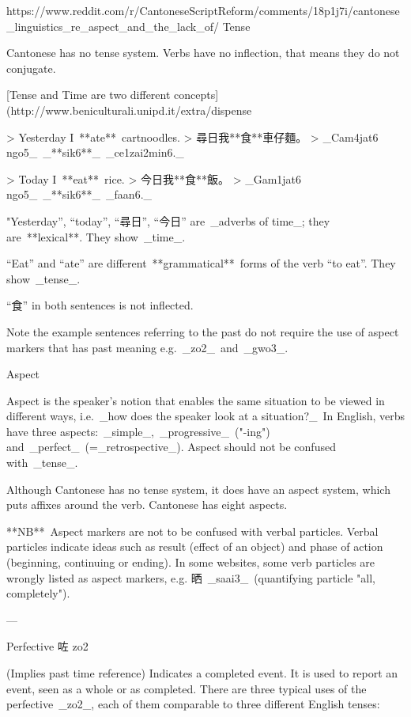 https://www.reddit.com/r/CantoneseScriptReform/comments/18p1j7i/cantonese_linguistics_re_aspect_and_the_lack_of/ 
Tense

Cantonese has no tense system. Verbs have no inflection, that means they do not conjugate.

[Tense and Time are two different concepts](http://www.beniculturali.unipd.it/extra/dispense%

> Yesterday I **ate** cartnoodles.  
> 尋日我**食**車仔麵。  
> _Cam4jat6 ngo5_ _**sik6**_ _ce1zai2min6._

> Today I **eat** rice.  
> 今日我**食**飯。  
> _Gam1jat6 ngo5_ _**sik6**_ _faan6._

"Yesterday”, “today”, “尋日”, “今日” are _adverbs of time_; they are **lexical**. They show _time_.

“Eat” and “ate” are different **grammatical** forms of the verb “to eat”. They show _tense_.

“食” in both sentences is not inflected.

Note the example sentences referring to the past do not require the use of aspect markers that has past meaning e.g. _zo2_ and _gwo3_.

Aspect

Aspect is the speaker's notion that enables the same situation to be viewed in different ways, i.e. _how does the speaker look at a situation?_ In English, verbs have three aspects: _simple_, _progressive_ ("-ing") and _perfect_ (=_retrospective_). Aspect should not be confused with _tense_.

Although Cantonese has no tense system, it does have an aspect system, which puts affixes around the verb. Cantonese has eight aspects.

**NB** Aspect markers are not to be confused with verbal particles. Verbal particles indicate ideas such as result (effect of an object) and phase of action (beginning, continuing or ending). In some websites, some verb particles are wrongly listed as aspect markers, e.g. 晒 _saai3_ (quantifying particle "all, completely").

---

Perfective 咗 zo2

(Implies past time reference) Indicates a completed event. It is used to report an event, seen as a whole or as completed.  
There are three typical uses of the perfective _zo2_, each of them comparable to three different English tenses:

